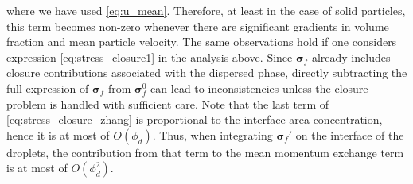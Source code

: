 where we have used \ref{eq:u_mean}.
Therefore, at least in the case of solid particles, this term becomes non-zero whenever there are significant gradients in volume fraction and mean particle velocity. %
The same observations hold if one considers expression \ref{eq:stress_closure1} in the analysis above. 
Since $\bm\sigma_f$ already includes closure contributions associated with the dispersed phase, directly subtracting the full expression of $\bm\sigma_f$ from $\bm\sigma_f^0$ can lead to inconsistencies unless the closure problem is handled with sufficient care. 
Note that the last term of \ref{eq:stress_closure_zhang} is proportional to the interface area concentration, hence it is at most of $O(\phi_d)$.
Thus, when integrating $\bm\sigma_f'$ on the interface of the droplets, the contribution from that term to the mean momentum exchange term is at most of $O(\phi_d^2)$. 

